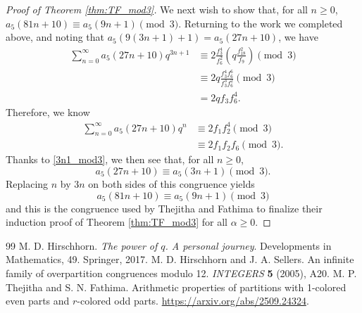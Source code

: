 \documentclass[10pt,a4paper]{amsart}
\theoremstyle{definition}
\theoremstyle{example}
\begin{document}
\begin{proof}[Proof of Theorem  \ref{thm:TF_mod3}]
We next wish to show that, for all $n\geq 0$, $a_5(81n+10)\equiv a_5(9n+1) \pmod{3}.$  Returning to the work we completed above, and noting that $a_5(9(3n+1)+1) = a_5(27n+10)$, we have 
\begin{align*}
\sum_{n=0}^\infty a_5(27n+10)q^{3n+1} 
&\equiv 
2\frac{f_3^4}{f_6^2}\left(q\frac{f_{18}^2}{f_9} \right) \pmod{3} \\
&\equiv 
2q\frac{f_3^4f_6^6}{f_3^3f_6^2}\pmod{3} \\
&= 
2qf_3f_6^4.
\end{align*}
Therefore, we know 
\begin{align*}
\sum_{n=0}^\infty a_5(27n+10)q^{n} 
&\equiv 
2f_1f_2^4 \pmod{3} \\
&\equiv 
2f_1f_2f_6 \pmod{3}.
\end{align*}
Thanks to \eqref{3n1_mod3}, we then see that, for all $n\geq 0$, 
$$
a_5(27n+10) \equiv a_5(3n+1) \pmod{3}.
$$
Replacing $n$ by $3n$ on both sides of this congruence yields $$
a_5(81n+10) \equiv a_5(9n+1) \pmod{3}
$$
and this is the congruence used by Thejitha and Fathima \cite{TF} to finalize their induction proof of Theorem \ref{thm:TF_mod3} for all $\alpha\geq 0$.  
\end{proof}

\begin{thebibliography}{99}
 M. D. Hirschhorn. \emph{The power of $q$. A personal journey}. Developments in Mathematics, 49. Springer, 2017. 
 M. D. Hirschhorn and J. A. Sellers. An infinite family of overpartition congruences modulo 12. \emph{INTEGERS} {\bf 5} (2005), A20. 
 M. P. Thejitha and S. N. Fathima. Arithmetic properties of partitions with 1-colored even parts and $r$-colored odd parts. \url{https://arxiv.org/abs/2509.24324}. \end{thebibliography} 
\end{document}
